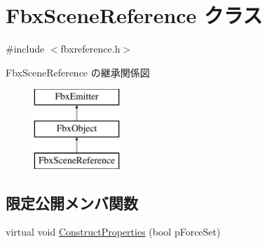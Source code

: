 \hypertarget{class_fbx_scene_reference}{}\section{Fbx\+Scene\+Reference クラス}
\label{class_fbx_scene_reference}


{\ttfamily \#include $<$fbxreference.\+h$>$}

Fbx\+Scene\+Reference の継承関係図\begin{figure}[H]
\begin{center}
\leavevmode
\includegraphics[height=3.000000cm]{class_fbx_scene_reference}
\end{center}
\end{figure}
\subsection*{限定公開メンバ関数}
\begin{DoxyCompactItemize}
\item 
virtual void \hyperlink{class_fbx_scene_reference_a93aabe2339dc932673dacb8be72eb813}{Construct\+Properties} (bool p\+Force\+Set)
\end{DoxyCompactItemize}
